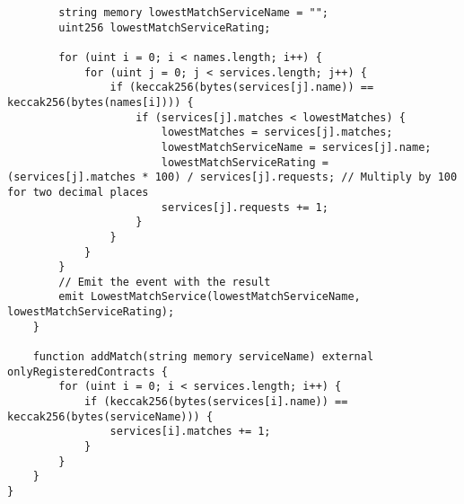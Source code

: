 \begin{lstlisting}
        string memory lowestMatchServiceName = "";
        uint256 lowestMatchServiceRating;

        for (uint i = 0; i < names.length; i++) {
            for (uint j = 0; j < services.length; j++) {
                if (keccak256(bytes(services[j].name)) == keccak256(bytes(names[i]))) {
                    if (services[j].matches < lowestMatches) {
                        lowestMatches = services[j].matches;
                        lowestMatchServiceName = services[j].name;
                        lowestMatchServiceRating = (services[j].matches * 100) / services[j].requests; // Multiply by 100 for two decimal places
                        services[j].requests += 1;
                    }
                }
            }
        }
        // Emit the event with the result
        emit LowestMatchService(lowestMatchServiceName, lowestMatchServiceRating);
    }

    function addMatch(string memory serviceName) external onlyRegisteredContracts {
        for (uint i = 0; i < services.length; i++) {
            if (keccak256(bytes(services[i].name)) == keccak256(bytes(serviceName))) {
                services[i].matches += 1;
            }
        }
    }
}
\end{lstlisting}
